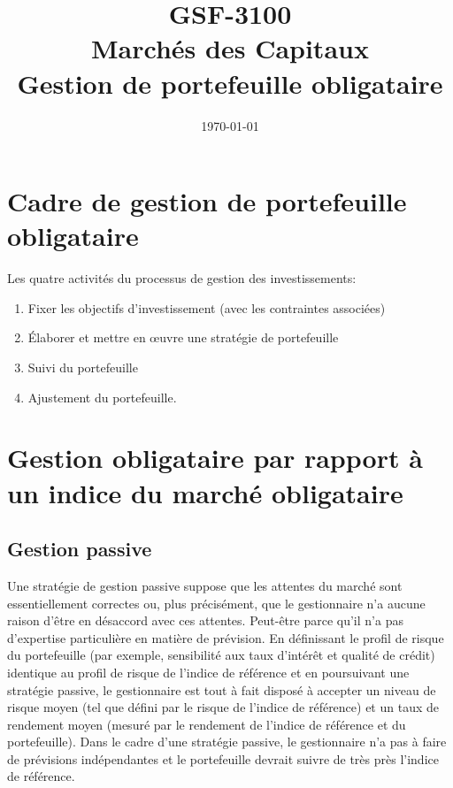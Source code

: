 \documentclass[12pt]{article}
\begin{document}
\begin{titlepage}
\title{GSF-3100 \\ Marchés des Capitaux \\ Gestion de portefeuille obligataire}
\date{\today}
\maketitle

\setcounter{page}{0}
\thispagestyle{empty}
\end{titlepage}
\pagebreak \newpage

\tableofcontents
\pagebreak \newpage

\section{Cadre de gestion de portefeuille obligataire}
Les quatre activités du processus de gestion des investissements:
\begin{enumerate}
\item Fixer les objectifs d'investissement (avec les contraintes associées)
\item Élaborer et mettre en œuvre une stratégie de portefeuille
\item Suivi du portefeuille
\item Ajustement du portefeuille.
\end{enumerate}

\section{Gestion obligataire par rapport à un indice du marché obligataire}
\subsection{Gestion passive}
Une stratégie de gestion passive suppose que les attentes du marché sont essentiellement correctes ou, plus précisément, que le gestionnaire n’a aucune raison d’être en désaccord avec ces attentes.  Peut-être parce qu’il n’a pas d’expertise particulière en matière de prévision. En définissant le profil de risque du portefeuille (par exemple, sensibilité aux taux d'intérêt et qualité de crédit) identique au profil de risque de l'indice de référence et en poursuivant une stratégie passive, le gestionnaire est tout à fait disposé à accepter un niveau de risque moyen (tel que défini par le risque de l'indice de référence) et un taux de rendement moyen (mesuré par le rendement de l'indice de référence et du portefeuille). Dans le cadre d'une stratégie passive, le gestionnaire n'a pas à faire de prévisions indépendantes et le portefeuille devrait suivre de très près l'indice de référence.
\end{document}
